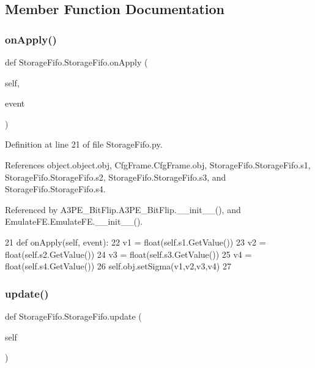 \subsection{Member Function Documentation}
\mbox{\label{classStorageFifo_1_1StorageFifo_a7fa51672518fefda7102ec998203508f}} 
\subsubsection{\texorpdfstring{on\+Apply()}{onApply()}}
{\footnotesize\ttfamily def Storage\+Fifo.\+Storage\+Fifo.\+on\+Apply (\begin{DoxyParamCaption}\item[{}]{self,  }\item[{}]{event }\end{DoxyParamCaption})}



Definition at line 21 of file Storage\+Fifo.\+py.



References object.\+object.\+obj, Cfg\+Frame.\+Cfg\+Frame.\+obj, Storage\+Fifo.\+Storage\+Fifo.\+s1, Storage\+Fifo.\+Storage\+Fifo.\+s2, Storage\+Fifo.\+Storage\+Fifo.\+s3, and Storage\+Fifo.\+Storage\+Fifo.\+s4.



Referenced by A3\+P\+E\+\_\+\+Bit\+Flip.\+A3\+P\+E\+\_\+\+Bit\+Flip.\+\_\+\+\_\+init\+\_\+\+\_\+(), and Emulate\+F\+E.\+Emulate\+F\+E.\+\_\+\+\_\+init\+\_\+\+\_\+().


\begin{DoxyCode}
21     \textcolor{keyword}{def }onApply(self, event):
22         v1 = float(self.s1.GetValue())
23         v2 = float(self.s2.GetValue())
24         v3 = float(self.s3.GetValue())
25         v4 = float(self.s4.GetValue())
26         self.obj.setSigma(v1,v2,v3,v4)
27 
\end{DoxyCode}
\mbox{\label{classStorageFifo_1_1StorageFifo_a6f95bfe2c70677ea813f3a708689686d}} 
\subsubsection{\texorpdfstring{update()}{update()}}
{\footnotesize\ttfamily def Storage\+Fifo.\+Storage\+Fifo.\+update (\begin{DoxyParamCaption}\item[{}]{self }\end{DoxyParamCaption})}



